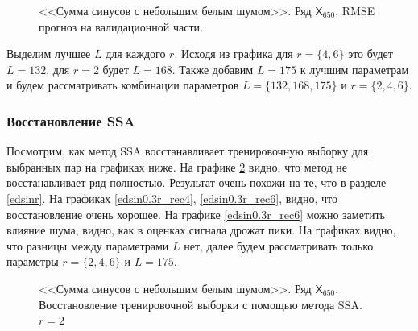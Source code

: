 \documentclass[specialist,
               substylefile = spbu.rtx,
               subf,href,colorlinks=true, 12p]{disser}
\begin{document}
\begin{figure}[H]
	\captionsetup{justification=centering}
	\caption{<<Сумма синусов с небольшим белым шумом>>. Ряд $\mathsf{X}_{650}$. RMSE прогноз на валидационной части.}
	\label{edsin0.3r_ssa_forecast}
\end{figure}

Выделим лучшее $L$ для каждого $r$. Исходя из графика для $r = \{4, 6\}$ это будет $L = 132$, для $r = 2$ будет $L = 168$. Также добавим $L = 175$ к лучшим параметрам и будем рассматривать комбинации параметров $L = \{132, 168, 175\}$ и $r = \{2, 4, 6\}$.

\subsubsection{Восстановление SSA}
Посмотрим, как метод SSA восстанавливает тренировочную выборку для выбранных пар на графиках ниже. На графике \ref{edsin0.3r_rec2} видно, что метод не восстанавливает ряд полностью. Результат очень похожи на те, что в разделе \ref{edsinr}. На графиках \ref{edsin0.3r_rec4}, \ref{edsin0.3r_rec6}, видно, что восстановление очень хорошее. На графике \ref{edsin0.3r_rec6} можно заметить влияние шума, видно, как в оценках сигнала дрожат пики. На графиках видно, что разницы между параметрами $L$ нет, далее будем рассматривать только параметры $r = \{ 2, 4, 6 \}$ и $L = 175$.

\begin{figure}[H]
	\captionsetup{justification=centering}
	\caption{<<Сумма синусов с небольшим белым шумом>>. Ряд $\mathsf{X}_{650}$. Восстановление тренировочной выборки с помощью метода SSA. $r = 2$}
	\label{edsin0.3r_rec2}
\end{figure}
\end{document}
